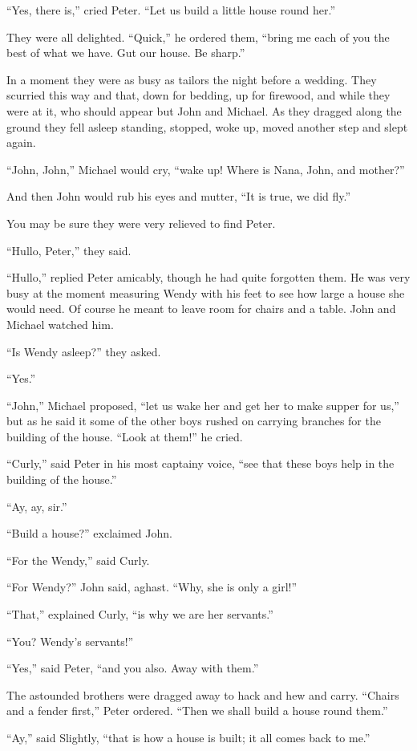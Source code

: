“Yes, there is,” cried Peter.
“Let us build a little house round her.”

They were all delighted.
“Quick,” he ordered them, “bring me each of you the best of what we have.
Gut our house.
Be sharp.”

In a moment they were as busy as tailors the night before a wedding.
They scurried this way and that, down for bedding, up for firewood,
and while they were at it, who should appear but John and Michael.
As they dragged along the ground they fell asleep standing,
stopped, woke up, moved another step and slept again.

“John, John,” Michael would cry, “wake up!
Where is Nana, John, and mother?”

And then John would rub his eyes and mutter, “It is true, we did fly.”

You may be sure they were very relieved to find Peter.

“Hullo, Peter,” they said.

“Hullo,” replied Peter amicably, though he had quite forgotten them.
He was very busy at the moment measuring Wendy with his feet to see how large a house she would need.
Of course he meant to leave room for chairs and a table.
John and Michael watched him.

“Is Wendy asleep?\@” they asked.

“Yes.”

“John,” Michael proposed, “let us wake her and get her to make supper for us,”
but as he said it some of the other boys rushed on carrying branches for the building of the house.
“Look at them!\@” he cried.

“Curly,” said Peter in his most captainy voice, “see that these boys help in the building of the house.”

“Ay, ay, sir.”

“Build a house?\@” exclaimed John.

“For the Wendy,” said Curly.

“For Wendy?\@” John said, aghast.
“Why, she is only a girl!”

“That,” explained Curly, “is why we are her servants.”

“You?
Wendy’s servants!”

“Yes,” said Peter, “and you also.
Away with them.”

The astounded brothers were dragged away to hack and hew and carry.
“Chairs and a fender first,” Peter ordered.
“Then we shall build a house round them.”

“Ay,” said Slightly, “that is how a house is built;
it all comes back to me.”

